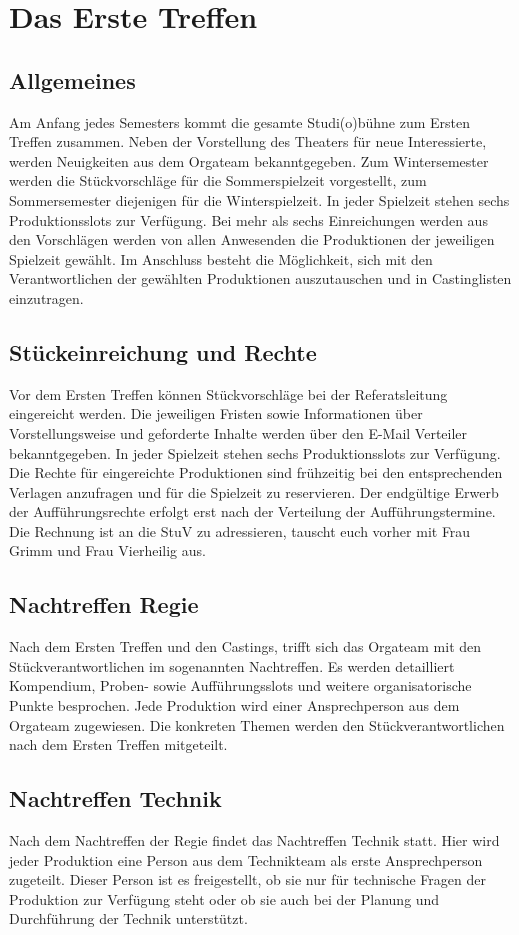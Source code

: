 \section{Das Erste Treffen}
\subsection{Allgemeines}
Am Anfang jedes Semesters kommt die gesamte Studi(o)bühne zum Ersten Treffen zusammen.	
Neben der Vorstellung des Theaters für neue Interessierte, werden Neuigkeiten aus dem Orgateam bekanntgegeben.
Zum Wintersemester werden die Stückvorschläge für die Sommerspielzeit vorgestellt, zum Sommersemester diejenigen für die Winterspielzeit.	
In jeder Spielzeit stehen sechs Produktionsslots zur Verfügung. Bei mehr als sechs Einreichungen werden aus den Vorschlägen werden von allen Anwesenden die Produktionen der jeweiligen Spielzeit gewählt.	
Im Anschluss besteht die Möglichkeit, sich mit den Verantwortlichen der gewählten Produktionen auszutauschen und in Castinglisten einzutragen.

\subsection{Stückeinreichung und Rechte}
Vor dem Ersten Treffen können Stückvorschläge bei der Referatsleitung eingereicht werden. Die jeweiligen Fristen sowie Informationen über Vorstellungsweise und geforderte Inhalte werden über den E-Mail Verteiler bekanntgegeben.	
In jeder Spielzeit stehen sechs Produktionsslots zur Verfügung. 
Die Rechte für eingereichte Produktionen sind frühzeitig bei den entsprechenden Verlagen anzufragen und für die Spielzeit zu reservieren. Der endgültige Erwerb der Aufführungsrechte erfolgt erst nach der Verteilung der Aufführungstermine. Die Rechnung ist an die StuV zu adressieren, tauscht euch vorher mit Frau Grimm und Frau Vierheilig aus. 

\subsection{Nachtreffen Regie}
Nach dem Ersten Treffen und den Castings, trifft sich das Orgateam mit den Stückverantwortlichen im sogenannten Nachtreffen.	
Es werden detailliert Kompendium, Proben- sowie Aufführungsslots und weitere organisatorische Punkte besprochen. Jede Produktion wird einer Ansprechperson aus dem Orgateam zugewiesen. 	
Die konkreten Themen werden den Stückverantwortlichen nach dem Ersten Treffen mitgeteilt.

\subsection{Nachtreffen Technik}
Nach dem Nachtreffen der Regie findet das Nachtreffen Technik statt. Hier wird jeder Produktion eine Person aus dem Technikteam als erste Ansprechperson zugeteilt. 
Dieser Person ist es freigestellt, ob sie nur für technische Fragen der Produktion zur Verfügung steht oder ob sie auch bei der Planung und Durchführung der Technik unterstützt.